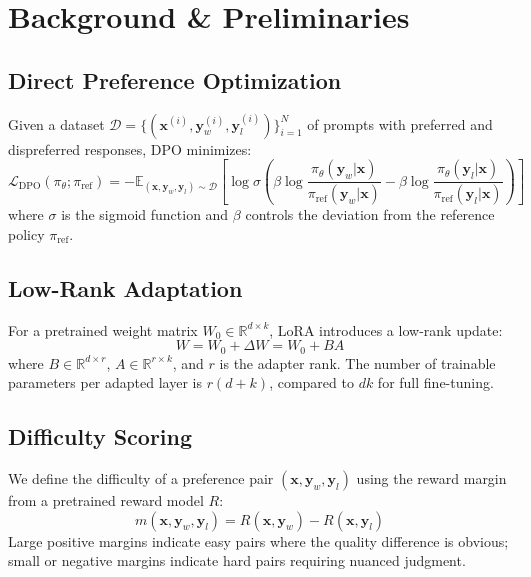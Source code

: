 \documentclass{article}
\begin{document}
\section{Background \& Preliminaries}

\subsection{Direct Preference Optimization}

Given a dataset $\mathcal{D} = \{(\mathbf{x}^{(i)}, \mathbf{y}_w^{(i)}, \mathbf{y}_l^{(i)})\}_{i=1}^{N}$ of prompts with preferred and dispreferred responses, DPO minimizes:
\begin{equation}
\mathcal{L}_{\text{DPO}}(\pi_\theta; \pi_{\text{ref}}) = -\mathbb{E}_{(\mathbf{x}, \mathbf{y}_w, \mathbf{y}_l) \sim \mathcal{D}} \left[ \log \sigma \left( \beta \log \frac{\pi_\theta(\mathbf{y}_w | \mathbf{x})}{\pi_{\text{ref}}(\mathbf{y}_w | \mathbf{x})} - \beta \log \frac{\pi_\theta(\mathbf{y}_l | \mathbf{x})}{\pi_{\text{ref}}(\mathbf{y}_l | \mathbf{x})} \right) \right]
\label{eq:dpo}
\end{equation}
where $\sigma$ is the sigmoid function and $\beta$ controls the deviation from the reference policy $\pi_{\text{ref}}$.

\subsection{Low-Rank Adaptation}

For a pretrained weight matrix $W_0 \in \mathbb{R}^{d \times k}$, LoRA introduces a low-rank update:
\begin{equation}
W = W_0 + \Delta W = W_0 + BA
\end{equation}
where $B \in \mathbb{R}^{d \times r}$, $A \in \mathbb{R}^{r \times k}$, and $r$ is the adapter rank. The number of trainable parameters per adapted layer is $r(d + k)$, compared to $dk$ for full fine-tuning.

\subsection{Difficulty Scoring}

We define the difficulty of a preference pair $(\mathbf{x}, \mathbf{y}_w, \mathbf{y}_l)$ using the reward margin from a pretrained reward model $R$:
\begin{equation}
m(\mathbf{x}, \mathbf{y}_w, \mathbf{y}_l) = R(\mathbf{x}, \mathbf{y}_w) - R(\mathbf{x}, \mathbf{y}_l)
\label{eq:margin}
\end{equation}
Large positive margins indicate easy pairs where the quality difference is obvious; small or negative margins indicate hard pairs requiring nuanced judgment.
\end{document}
